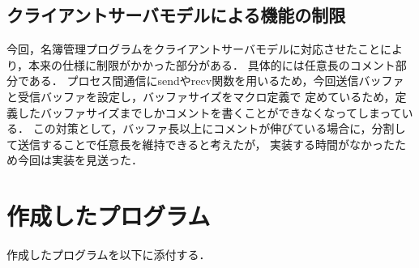\documentclass[a4paper,11pt]{jarticle}
\begin{document}
\subsection{クライアントサーバモデルによる機能の制限}
今回，名簿管理プログラムをクライアントサーバモデルに対応させたことにより，本来の仕様に制限がかかった部分がある．
具体的には任意長のコメント部分である．
プロセス間通信にsendやrecv関数を用いるため，今回送信バッファと受信バッファを設定し，バッファサイズをマクロ定義で
定めているため，定義したバッファサイズまでしかコメントを書くことができなくなってしまっている．
この対策として，バッファ長以上にコメントが伸びている場合に，分割して送信することで任意長を維持できると考えたが，
実装する時間がなかったため今回は実装を見送った．

\section{作成したプログラム}

作成したプログラムを以下に添付する．
\end{document}
